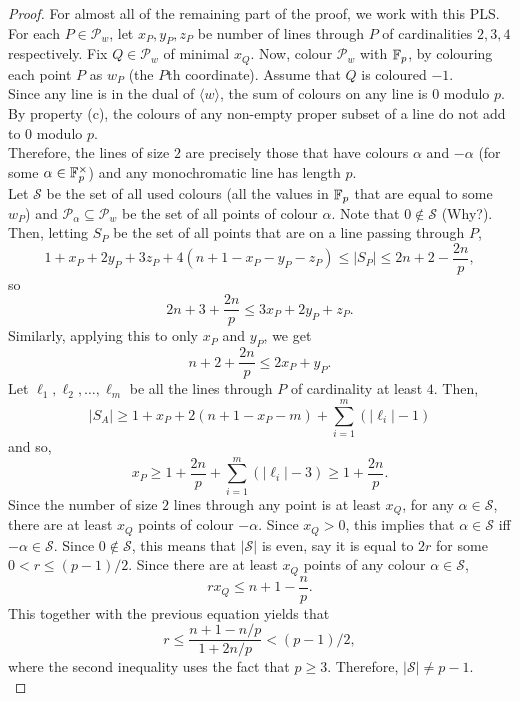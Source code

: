 \begin{proof}
		For almost all of the remaining part of the proof, we work with this PLS.\\
		For each $P \in \mathcal{P}_w$, let $x_P,y_P,z_P$ be number of lines through $P$ of cardinalities $2,3,4$ respectively. Fix $Q \in \mathcal{P}_w$ of minimal $x_Q$. Now, colour $\mathcal{P}_w$ with $\mathbb{F}_p$, by colouring each point $P$ as $w_P$ (the $P$th coordinate). Assume that $Q$ is coloured $-1$.\\
		Since any line is in the dual of $\langle w \rangle$, the sum of colours on any line is $0$ modulo $p$.\\
		By property (c), the colours of any non-empty proper subset of a line do not add to $0$ modulo $p$.\\
		Therefore, the lines of size $2$ are precisely those that have colours $\alpha$ and $-\alpha$ (for some $\alpha \in \mathbb{F}_p^\times$) and any monochromatic line has length $p$.\\
		Let $\mathcal{S}$ be the set of all used colours (all the values in $\mathbb{F}_p$ that are equal to some $w_P$) and $\mathcal{P}_\alpha \subseteq \mathcal{P}_w$ be the set of all points of colour $\alpha$. Note that $0 \not\in \mathcal{S}$ (Why?). Then, letting $S_P$ be the set of all points that are on a line passing through $P$,
		\[ 1 + x_P + 2 y_P + 3 z_P + 4(n+1 - x_P - y_P - z_P) \le |S_P| \le 2n+2-\frac{2n}{p}, \]
		so
		\begin{equation}
			\label{eqn: xP yP zP joint bound}
			2n+3+\frac{2n}{p} \le 3 x_P + 2 y_P + z_P.
		\end{equation}
		Similarly, applying this to only $x_P$ and $y_P$, we get
		\begin{equation}
			\label{eqn: xP yP joint bound}
			n+2+\frac{2n}{p} \le 2x_P + y_P.
		\end{equation}
		Let $\ell_1,\ell_2,\ldots,\ell_m$ be all the lines through $P$ of cardinality at least $4$. Then,
		\[ |S_A| \ge 1 + x_P + 2(n+1 - x_P - m) + \sum_{i = 1}^{m} (|\ell_i| - 1) \]
		and so,
		\begin{equation}
			\label{eqn: xP line bound}
			x_P \ge 1 + \frac{2n}{p} + \sum_{i=1}^{m} (|\ell_i| - 3) \ge 1 + \frac{2n}{p}.	
		\end{equation}
		Since the number of size $2$ lines through any point is at least $x_Q$, for any $\alpha \in \mathcal{S}$, there are at least $x_Q$ points of colour $-\alpha$. Since $x_Q > 0$, this implies that $\alpha \in \mathcal{S}$ iff $-\alpha \in \mathcal{S}$. Since $0 \not\in \mathcal{S}$, this means that $|\mathcal{S}|$ is even, say it is equal to $2r$ for some $0 < r \le (p-1)/2$. Since there are at least $x_Q$ points of any colour $\alpha \in \mathcal{S}$,
		\begin{equation}
			\label{eqn: xQ bound}
			r x_Q \le n + 1 - \frac{n}{p}.	
		\end{equation}
		This together with the previous equation yields that
		\[ r \le \frac{n+1 - n/p}{1 + 2n/p} < (p-1)/2, \]
		where the second inequality uses the fact that $p \ge 3$. Therefore, $|\mathcal{S}| \ne p-1$.\\



\end{proof}
